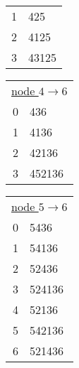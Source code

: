 \begin{table}
\begin{tabular}[t]{rl}
1 & 425\\
2 & 4125\\
3 & 43125
\end{tabular}
\begin{tabular}[t]{rl}
\multicolumn{2}{c}{\underline{node $4 \rightarrow 6$}}\\
0 & 436\\
1 & 4136\\
2 & 42136\\
3 & 452136 
\end{tabular}
\begin{tabular}[t]{rl}
\multicolumn{2}{c}{\underline{node $5 \rightarrow 6$}}\\
0 & 5436\\
1 & 54136\\
2 & 52436\\
3 & 524136\\
4 & 52136\\
5 & 542136\\
6 & 521436
\end{tabular}
\end{table}



